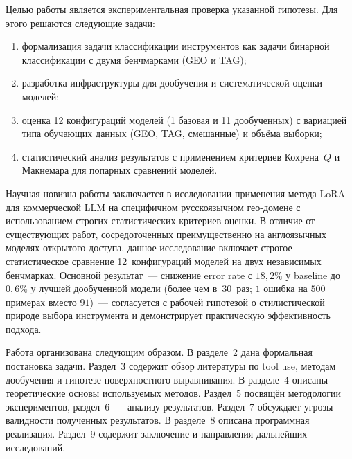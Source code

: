 Целью работы является экспериментальная проверка указанной гипотезы. Для этого решаются следующие задачи:
\begin{enumerate}
    \item формализация задачи классификации инструментов как задачи бинарной классификации с двумя бенчмарками (GEO и TAG);
    \item разработка инфраструктуры для дообучения и систематической оценки моделей;
    \item оценка 12 конфигураций моделей (1 базовая и 11 дообученных) с вариацией типа обучающих данных (GEO, TAG, смешанные) и объёма выборки;
    \item статистический анализ результатов с применением критериев Кохрена~$Q$ и Макнемара для попарных сравнений моделей.
\end{enumerate}

Научная новизна работы заключается в исследовании применения метода LoRA для коммерческой LLM на специфичном русскоязычном гео-домене с использованием строгих статистических критериев оценки. В отличие от существующих работ, сосредоточенных преимущественно на англоязычных моделях открытого доступа, данное исследование включает строгое статистическое сравнение 12~конфигураций моделей на двух независимых бенчмарках. Основной результат~--- снижение error rate с $18{,}2\%$ у baseline до $0{,}6\%$ у лучшей дообученной модели (более чем в~$30$~раз; $1$ ошибка на $500$ примерах вместо $91$)~--- согласуется с рабочей гипотезой о стилистической природе выбора инструмента и демонстрирует практическую эффективность подхода.

Работа организована следующим образом. В разделе~2 дана формальная постановка задачи. Раздел~3 содержит обзор литературы по tool use, методам дообучения и гипотезе поверхностного выравнивания. В разделе~4 описаны теоретические основы используемых методов. Раздел~5 посвящён методологии экспериментов, раздел~6~--- анализу результатов. Раздел~7 обсуждает угрозы валидности полученных результатов. В разделе~8 описана программная реализация. Раздел~9 содержит заключение и направления дальнейших исследований.
